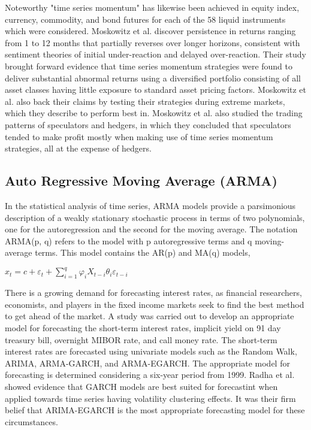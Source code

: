 Noteworthy "time series momentum" has likewise been achieved in equity index, currency, commodity, and bond futures for each of the 58 liquid instruments which were considered.\cite{Moskowitz:2011aa} Moskowitz et al. discover persistence in returns ranging from 1 to 12 months that partially reverses over longer horizons, consistent with sentiment theories of initial under-reaction and delayed over-reaction. Their study brought forward evidence that time series momentum strategies were found to deliver substantial abnormal returns using a diversified portfolio consisting of all asset classes having little exposure to standard asset pricing factors. Moskowitz et al. also back their claims by testing their strategies during extreme markets, which they describe to perform best in. Moskowitz et al. also studied the trading patterns of speculators and hedgers, in which they concluded that speculators tended to make profit mostly when making use of time series momentum strategies, all at the expense of hedgers.

\subsection{Auto Regressive Moving Average (ARMA)}

In the statistical analysis of time series, ARMA models provide a parsimonious description of a weakly stationary stochastic process in terms of two polynomials, one for the autoregression and the second for the moving average. The notation ARMA(p, q) refers to the model with p autoregressive terms and q moving-average terms. This model contains the AR(p) and MA(q) models,

\(x_t = c+\varepsilon_t+\sum^{q}_{i=1} \varphi_iX_{t-i}\theta_i\varepsilon_{t-i}\)

There is a growing demand for forecasting interest rates, as financial researchers, economists, and players in the fixed income markets seek to find the best method to get ahead of the market. A study was carried out to develop an appropriate model for forecasting the short-term interest rates, implicit yield on 91 day treasury bill, overnight MIBOR rate, and call money rate.\cite{Radha:2015aa} The short-term interest rates are forecasted using univariate models such as the Random Walk, ARIMA, ARMA-GARCH, and ARMA-EGARCH. The appropriate model for forecasting is determined considering a six-year period from 1999. 
Radha et al. showed evidence that GARCH models are best suited for forecastint when applied towards time series having volatility clustering effects. It was their firm belief that ARIMA-EGARCH is the most appropriate forecasting model for these circumstances.

